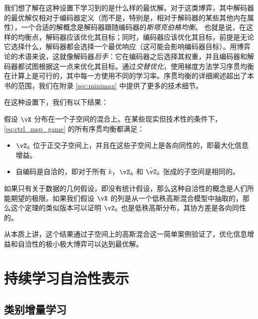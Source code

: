 \documentclass[../../book-main.tex]{subfiles}
\begin{document}
我们想了解在这种设置下学习到的是什么样的最优解。对于这类博弈，其中解码器的最优解仅相对于编码器定义（而不是，特别是，相对于解码器的某些其他内在属性），一个合适的解概念是解码器跟随编码器的\textit{斯塔克伯格均衡}。%
也就是说，在这样的均衡点，解码器应该优化其目标；同时，编码器应该优化其目标，前提是无论它选择什么，解码器都会选择一个最优响应（这可能会影响编码器目标）。用博弈论的术语来说，这就像解码器\textit{后手}：它在编码器之后选择其权重，并且编码器和解码器都试图根据这一点来优化其目标。通过\textit{交替优化}，使用梯度方法学习序贯均衡在计算上是可行的，其中每一方使用不同的学习率。序贯均衡的详细阐述超出了本书的范围，我们在附录 \ref{sec:minimax} 中提供了更多的技术细节。

在这种设置下，我们有以下结果：
\begin{theorem}\label{thm:ctrl_theory}
    假设 \(\vX\) 分布在一个子空间的混合上。在某些现实但技术性的条件下，\eqref{eq:ctrl_msp_game} 的所有序贯均衡都满足：
    \begin{itemize}
        \item \(\vZ_{k}\) 位于正交子空间上，并且在这些子空间上是各向同性的，即最大化信息增益。
        \item 自编码是自洽的，即对于所有 \(k\)，\(\vZ_{k}\) 和 \(\hat{\vZ}_{k}\) 张成的子空间是相同的。
    \end{itemize}
\end{theorem}
如果只有关于数据的几何假设，即没有统计假设，那么这种自洽性的概念是人们所能期望的极限。如果我们假设 \(\vX\) 的列是从一个低秩高斯混合模型中抽取的，那么这个定理的类似版本可以证明 \(\vZ_{k}\) 也是低秩高斯分布，其协方差是各向同性的。%

从本质上讲，这个结果通过子空间上的高斯混合这一简单案例验证了，优化信息增益和自洽性的极小极大博弈可以达到最优解。






\section{持续学习自洽性表示}
\label{sec:continuous}

\subsection{类别增量学习}
\label{sec:class-wise-incremental}
\end{document}
